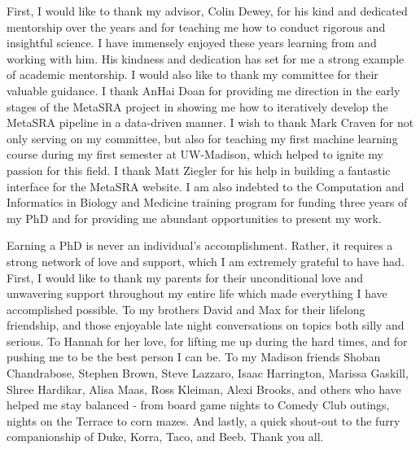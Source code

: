 First, I would like to thank my advisor, Colin Dewey, for his kind and dedicated mentorship over the years and for teaching me how to conduct rigorous and insightful science.  I have immensely enjoyed these years learning from and working with him. His kindness and dedication has set for me a strong example of academic mentorship.  I would also like to thank my committee for their valuable guidance. I thank AnHai Doan for providing me direction in the early stages of the MetaSRA project in showing me how to iteratively develop the MetaSRA pipeline in a data-driven manner.  I wish to thank Mark Craven for not only serving on my committee, but also for teaching my first machine learning course during my first semester at UW-Madison, which helped to ignite my passion for this field. I thank Matt Ziegler for his help in building a fantastic interface for the MetaSRA website.  I am also indebted to the Computation and Informatics in Biology and Medicine training program for funding three years of my PhD and for providing me abundant opportunities to present my work. 

Earning a PhD is never an individual's accomplishment.  Rather, it requires a strong network of love and support, which I am extremely grateful to have had. First, I would like to thank my parents for their unconditional love and unwavering support throughout my entire life which made everything I have accomplished possible. To my brothers David and Max for their lifelong friendship, and those enjoyable late night conversations on topics both silly and serious. To Hannah for her love, for lifting me up during the hard times, and for pushing me to be the best person I can be.  To my Madison friends Shoban Chandrabose, Stephen Brown, Steve Lazzaro, Isaac Harrington, Marissa Gaskill, Shree Hardikar, Alisa Maas, Ross Kleiman, Alexi Brooks, and others who have helped me stay balanced - from board game nights to Comedy Club outings, nights on the Terrace to corn mazes. And lastly, a quick shout-out to the furry companionship of Duke, Korra, Taco, and Beeb.  Thank you all.
